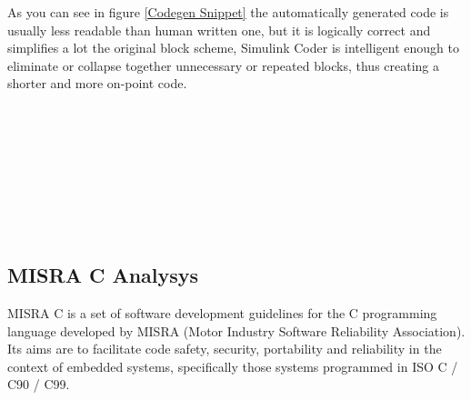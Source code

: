 As you can see in figure \ref{Codegen Snippet} the automatically generated code is usually less readable than human written one, but it is logically correct and simplifies a lot the original block scheme, Simulink Coder is intelligent enough to eliminate or collapse together unnecessary or repeated blocks, thus creating a shorter and more on-point code.\\\\\\
\\
\\
\\
\\
\\
\\
\subsection{MISRA C Analysys}

MISRA C is a set of software development guidelines for the C programming language developed by MISRA (Motor Industry Software Reliability Association). Its aims are to facilitate code safety, security, portability and reliability in the context of embedded systems, specifically those systems programmed in ISO C / C90 / C99.

